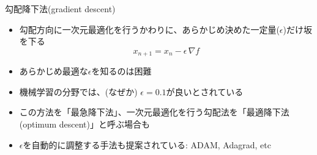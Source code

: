 \begin{frame}[t,fragile]{勾配降下法(gradient descent)}
  \begin{itemize}
  \item 勾配方向に一次元最適化を行うかわりに、あらかじめ決めた一定量($\epsilon$)だけ坂を下る
    \[
    x_{n+1} = x_n - \epsilon \, \nabla f
    \]
  \item あらかじめ最適な$\epsilon$を知るのは困難
  \item 機械学習の分野では、(なぜか) $\epsilon=0.1$が良いとされている
  \item この方法を「最急降下法」、一次元最適化を行う勾配法を「最適降下法(optimum descent)」と呼ぶ場合も
  \item $\epsilon$を自動的に調整する手法も提案されている: ADAM, Adagrad, etc
  \end{itemize}
\end{frame}
